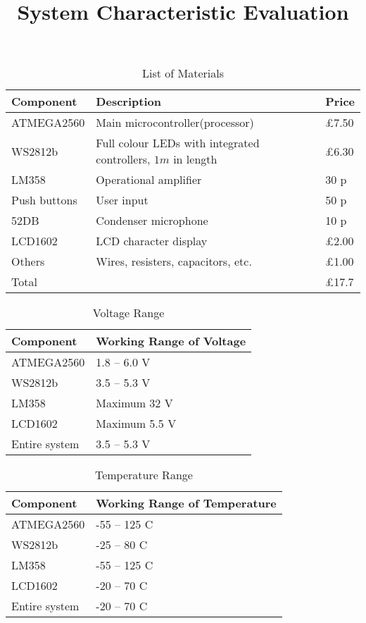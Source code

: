 \documentclass[12pt]{article}
\title{System Characteristic Evaluation}
\begin{document}
\begin{table}[H!]\centering
  \caption{List of Materials}
  \begin{tabular}{l|l|l}
    \hline
    Component & Description & Price \\
    \hline
    ATMEGA2560 & Main microcontroller(processor) & \pounds 7.50 \\
    WS2812b & Full colour LEDs with integrated controllers, $1m$ in length & \pounds 6.30 \\
    LM358 & Operational amplifier & 30 p \\
    Push buttons & User input & 50 p \\
    52DB & Condenser microphone & 10 p \\
    LCD1602 & LCD character display & \pounds 2.00 \\
    Others & Wires, resisters, capacitors, etc. & \pounds 1.00 \\
    \hline
    Total & & \pounds 17.7 \\
    \hline
  \end{tabular}
\end{table}

\begin{table}[H!]\centering
  \caption{Voltage Range}
  \begin{tabular}{l|l}
    \hline
    Component & Working Range of Voltage \\
    \hline
    ATMEGA2560 & 1.8 -- 6.0 V \\
    WS2812b & 3.5 -- 5.3 V \\
    LM358 & Maximum 32 V \\
    LCD1602 & Maximum 5.5 V \\
    \hline
    Entire system & 3.5 -- 5.3 V \\
    \hline
  \end{tabular}
\end{table}

\begin{table}[H!]\centering
  \caption{Temperature Range}
  \begin{tabular}{l|l}
    \hline
    Component & Working Range of Temperature \\
    \hline
    ATMEGA2560 & -55 -- 125 \textdegree{}C \\
    WS2812b & -25 -- 80 \textdegree{}C \\
    LM358 & -55 -- 125 \textdegree{}C \\
    LCD1602 & -20 -- 70 \textdegree{}C \\
    \hline
    Entire system & -20 -- 70 \textdegree{}C \\
    \hline
  \end{tabular}
\end{table}
\end{document}
